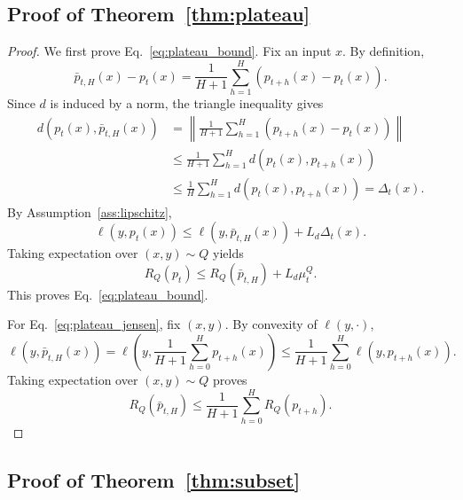 \documentclass{article}
\begin{document}
\subsection{Proof of Theorem~\ref{thm:plateau}}

\begin{proof}
We first prove Eq.~\eqref{eq:plateau_bound}. Fix an input $x$. By definition,
\begin{equation}
    \bar p_{t,H}(x) - p_t(x)
    =
    \frac{1}{H+1}\sum_{h=1}^{H}\left(p_{t+h}(x)-p_t(x)\right).
\end{equation}
Since $d$ is induced by a norm, the triangle inequality gives
\begin{align}
    d\!\left(p_t(x), \bar p_{t,H}(x)\right)
    &=
    \left\|
    \frac{1}{H+1}\sum_{h=1}^{H}\left(p_{t+h}(x)-p_t(x)\right)
    \right\| \\
    &\le
    \frac{1}{H+1}\sum_{h=1}^{H} d\!\left(p_t(x), p_{t+h}(x)\right) \\
    &\le
    \frac{1}{H}\sum_{h=1}^{H} d\!\left(p_t(x), p_{t+h}(x)\right)
    =
    \Delta_t(x).
\end{align}
By Assumption~\ref{ass:lipschitz},
\begin{equation}
    \ell\!\left(y, p_t(x)\right)
    \le
    \ell\!\left(y, \bar p_{t,H}(x)\right)
    +
    L_d \Delta_t(x).
\end{equation}
Taking expectation over $(x,y)\sim Q$ yields
\begin{equation}
    R_Q(p_t)
    \le
    R_Q(\bar p_{t,H}) + L_d \mu_t^Q.
\end{equation}
This proves Eq.~\eqref{eq:plateau_bound}.

For Eq.~\eqref{eq:plateau_jensen}, fix $(x,y)$. By convexity of $\ell(y,\cdot)$,
\begin{equation}
    \ell\!\left(y,\bar p_{t,H}(x)\right)
    =
    \ell\!\left(
        y,
        \frac{1}{H+1}\sum_{h=0}^{H} p_{t+h}(x)
    \right)
    \le
    \frac{1}{H+1}\sum_{h=0}^{H}\ell\!\left(y,p_{t+h}(x)\right).
\end{equation}
Taking expectation over $(x,y)\sim Q$ proves
\begin{equation}
    R_Q(\bar p_{t,H})
    \le
    \frac{1}{H+1}\sum_{h=0}^{H} R_Q(p_{t+h}).
\end{equation}
\end{proof}

\subsection{Proof of Theorem~\ref{thm:subset}}
\end{document}
